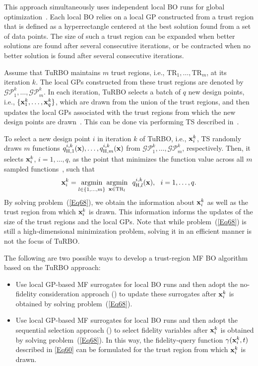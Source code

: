 \documentclass[iicol,sn-basic]{sn-jnl}%
\begin{document}
This approach simultaneously uses independent local BO runs for global optimization~\citep{Eriksson2019}.
Each local BO relies on a local GP constructed from a trust region that is defined as a hyperrectangle centered at the best solution found from a set of data points.
The size of such a trust region can be expanded when better solutions are found after several consecutive iterations, or be contracted when no better solution is found after several consecutive iterations.

Assume that TuRBO maintains $m$ trust regions, i.e., $\text{TR}_1,\dots,\text{TR}_m$, at its iteration $k$.
The local GPs constructed from these trust regions are denoted by $\mathcal{GP}_1^k,\dots,\mathcal{GP}_m^k$.
In each iteration, TuRBO selects a batch of $q$ new design points, i.e., $\{{\bf x}_1^k,\dots,{\bf x}_q^k\}$, which are drawn from the union of the trust regions, and then updates the local GPs associated with the trust regions from which the new design points are drawn~\citep{Eriksson2019}.
This can be done via performing TS described in~.

To select a new design point $i$ in iteration $k$ of TuRBO, i.e., ${\bf x}_i^k$, TS randomly draws $m$ functions $q_{\text{H},1}^{i,k}({\bf x}), \dots,q_{\text{H},m}^{i,k}({\bf x})$ from  $\mathcal{GP}_1^k,\dots,\mathcal{GP}_m^k$, respectively.
Then, it selects ${\bf x}_i^k$, $i=1,\dots,q$, as the point that minimizes the  function value across all $m$ sampled functions~\citep{Eriksson2019}, such that
\begin{equation}\label{Eq68}
	{\bf x}_i^k = \underset{l \in \{1,\dots,m\}}{\mathrm{argmin}}\,\underset{{\bf x} \in \text{TR}_l }{\mathrm{argmin}} \ \ q_{\text{H},l}^{i,k}({\bf x}), \ \ i=1,\dots,q.
\end{equation}
By solving problem~(\ref{Eq68}), we obtain the information about ${\bf x}_i^k$ as well as the trust region from which ${\bf x}_i^k$ is drawn.
This information informs the updates of the size of the trust regions and the local GPs.
Note that while problem~(\ref{Eq68}) is still a high-dimensional minimization problem, solving it in an efficient manner is not the focus of TuRBO.

The following are two possible ways to develop a trust-region MF BO algorithm based on the TuRBO approach:
\begin{itemize}
	\item Use local GP-based MF surrogates for local BO runs and then adopt the no-fidelity consideration approach () to update these surrogates after ${\bf x}_i^k$ is obtained by solving problem~(\ref{Eq68}).
	
	\item Use local GP-based MF surrogates for local BO runs and then adopt the sequential selection approach () to select fidelity variables after ${\bf x}_i^k$ is obtained by solving problem~(\ref{Eq68}).
	In this way, the fidelity-query function $\gamma({\bf x}_i^k,t)$ described in \cref{Eq60} can be formulated for the trust region from which ${\bf x}_i^k$ is drawn.
\end{itemize}   
\end{document}
